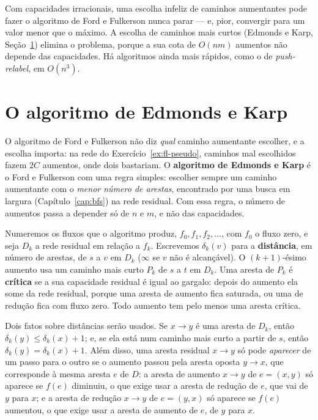\begin{complemento}
Com capacidades irracionais, uma escolha infeliz de caminhos aumentantes pode fazer o algoritmo de Ford e Fulkerson nunca parar --- e, pior, convergir para um valor menor que o máximo. A escolha de caminhos mais curtos (Edmonds e Karp, Seção~\ref{sec:edmondskarp}) elimina o problema, porque a sua cota de $O(nm)$ aumentos não depende das capacidades. Há algoritmos ainda mais rápidos, como o de \emph{push-relabel}, em $O(n^3)$.
\end{complemento}

\section{O algoritmo de Edmonds e Karp}\label{sec:edmondskarp}
O algoritmo de Ford e Fulkerson não diz \emph{qual} caminho aumentante escolher, e a escolha importa: na rede do Exercício~\ref{ex:fl-pseudo}, caminhos mal escolhidos fazem $2C$ aumentos, onde dois bastariam. O \textbf{algoritmo de Edmonds e Karp} é o Ford e Fulkerson com uma regra simples: escolher sempre um caminho aumentante com o \emph{menor número de arestas}, encontrado por uma busca em largura (Capítulo~\ref{cap:bfs}) na rede residual. Com essa regra, o número de aumentos passa a depender só de $n$ e $m$, e não das capacidades.

Numeremos os fluxos que o algoritmo produz, $f_0,f_1,f_2,\dots$, com $f_0$ o fluxo zero, e seja $D_k$ a rede residual em relação a $f_k$. Escrevemos $\delta_k(v)$ para a \textbf{distância}, em número de arestas, de $s$ a $v$ em $D_k$ ($\infty$ se $v$ não é alcançável). O $(k+1)$-ésimo aumento usa um caminho mais curto $P_k$ de $s$ a $t$ em $D_k$. Uma aresta de $P_k$ é \textbf{crítica} se a sua capacidade residual é igual ao gargalo: depois do aumento ela some da rede residual, porque uma aresta de aumento fica saturada, ou uma de redução fica com fluxo zero. Todo aumento tem pelo menos uma aresta crítica.

Dois fatos sobre distâncias serão usados. Se $x\to y$ é uma aresta de $D_k$, então $\delta_k(y)\le\delta_k(x)+1$; e, se ela está num caminho mais curto a partir de $s$, então $\delta_k(y)=\delta_k(x)+1$. Além disso, uma aresta residual $x\to y$ só pode \emph{aparecer} de um passo para o outro se o aumento passou pela aresta oposta $y\to x$, que corresponde à mesma aresta $e$ de $D$: a aresta de aumento $x\to y$ de $e=(x,y)$ só aparece se $f(e)$ diminuiu, o que exige usar a aresta de redução de $e$, que vai de $y$ para $x$; e a aresta de redução $x\to y$ de $e=(y,x)$ só aparece se $f(e)$ aumentou, o que exige usar a aresta de aumento de $e$, de $y$ para $x$.

